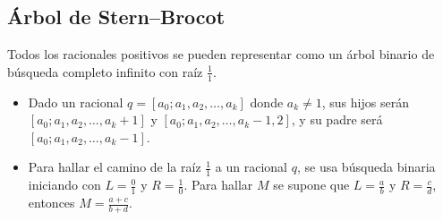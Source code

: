 \documentclass[11pt]{article}
\begin{document}
		\subsection{Árbol de Stern–Brocot}
			Todos los racionales positivos se pueden representar como un árbol binario de búsqueda completo infinito con raíz $\frac{1}{1}$.
			\begin{itemize}
				\item Dado un racional $q=[a_0;a_1,a_2,\ldots,a_k]$ donde $a_k \neq 1$, sus hijos serán $[a_0;a_1,a_2,\ldots,a_k+1]$ y $[a_0;a_1,a_2,\ldots,a_k-1,2]$, y su padre será $[a_0;a_1,a_2,\ldots,a_k-1]$.
				\item Para hallar el camino de la raíz $\frac{1}{1}$ a un racional $q$, se usa búsqueda binaria iniciando con $L=\frac{0}{1}$ y $R=\frac{1}{0}$. Para hallar $M$ se supone que $L=\frac{a}{b}$ y $R=\frac{c}{d}$, entonces $M=\frac{a+c}{b+d}$.
			\end{itemize}
	
\end{document}
